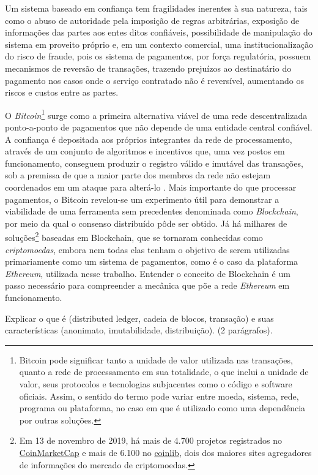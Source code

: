 \documentclass[a4paper,11pt]{article}
\begin{document}
Um sistema baseado em confiança tem fragilidades inerentes à sua natureza, tais como o abuso de autoridade pela imposição de regras arbitrárias, exposição de informações das partes aos entes ditos confiáveis, possibilidade de manipulação do sistema em proveito próprio e, em um contexto comercial, uma institucionalização do risco de fraude, pois os sistema de pagamentos, por força regulatória, possuem mecanismos de reversão de transações, trazendo prejuízos ao destinatário do pagamento nos casos onde o serviço contratado não é reversível, aumentando os riscos e custos entre as partes.

O \emph{Bitcoin}\footnote{Bitcoin pode significar tanto a unidade de valor utilizada nas transações, quanto a rede de processamento em sua totalidade, o que inclui a unidade de valor, seus protocolos e tecnologias subjacentes como o código e software oficiais.
Assim, o sentido do termo pode variar entre moeda, sistema, rede, programa ou plataforma, no caso em que é utilizado como uma dependência por outras soluções.}
surge como a primeira alternativa viável de uma rede descentralizada ponto-a-ponto de pagamentos que não depende de uma entidade central confiável.
A confiança é depositada aos próprios integrantes da rede de processamento, através de um conjunto de algoritmos e incentivos que, uma vez postos em funcionamento, conseguem produzir o registro válido e imutável das transações, sob a premissa de que a maior parte dos membros da rede não estejam coordenados em um ataque para alterá-lo \cite{nakamoto2008bitcoin}.
Mais importante do que processar pagamentos, o Bitcoin revelou-se um experimento útil para demonstrar a viabilidade de uma ferramenta sem precedentes denominada como \emph{Blockchain}, por meio da qual o consenso distribuído pôde ser obtido.
Já há milhares de
soluções\footnote{Em 13 de novembro de 2019, há mais de 4.700 projetos registrados no \href{https://coinmarketcap.com/}{CoinMarketCap} e mais de 6.100 no \href{https://coinlib.io/}{coinlib}, dois dos maiores sites agregadores de informações do mercado de criptomoedas.}
baseadas em Blockchain, que se tornaram conhecidas como \emph{criptomoedas}, embora nem todas elas tenham o objetivo de serem utilizadas primariamente como um sistema de pagamentos, como é o caso da plataforma \emph{Ethereum}, utilizada nesse trabalho.
Entender o conceito de Blockchain é um passo necessário para compreender a mecânica que põe a rede \emph{Ethereum} em funcionamento.

{\color{ForestGreen}Explicar o que é (distributed ledger, cadeia de blocos, transação) e suas características (anonimato, imutabilidade, distribuição). (2 parágrafos).}
\end{document}
